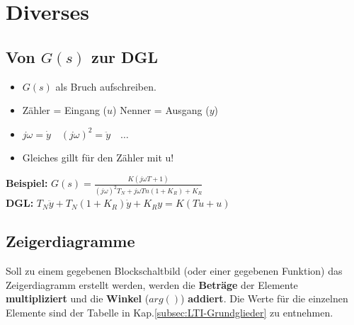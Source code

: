 \section{Diverses}

\subsection{Von $G(s)$ zur DGL}
  \begin{multicols}{2}
    \begin{itemize}
      \item $G(s)$ als Bruch aufschreiben.
			\item Zähler = Eingang ($u$) \quad Nenner = Ausgang ($y$)
 			\item $j\omega = \dot{y} \quad (j\omega)^2 = \ddot{y} \quad \ldots $
 			\item Gleiches gillt für den Zähler mit u!
		\end{itemize}
	\columnbreak
		\textbf{Beispiel:} $G(s) = \frac{K(j \omega T + 1)}{(j\omega)^2 T_N + j \omega Tn(1+K_R) + K_R}$ \\			
		\textbf{DGL:} $T_N \ddot{y} + T_N(1+K_R) \dot{y} + K_R y = K(T \dot{u} + u)$
  \end{multicols}    	
    
\subsection{Zeigerdiagramme}
  Soll zu einem gegebenen Blockschaltbild (oder einer gegebenen Funktion) das Zeigerdiagramm erstellt 
  werden, werden die \textbf{Beträge} der Elemente \textbf{multipliziert} und
  die \textbf{Winkel} ($arg()$) \textbf{addiert}. Die Werte für die einzelnen Elemente sind der Tabelle in Kap.\ref{subsec:LTI-Grundglieder}  zu entnehmen. 

